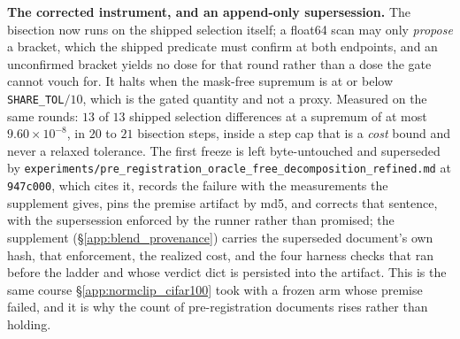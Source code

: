 \documentclass{article}
\begin{document}
\textbf{The corrected instrument, and an append-only supersession.} The bisection now runs on the shipped selection itself; a float64 scan may only \emph{propose} a bracket, which the shipped predicate must confirm at both endpoints, and an unconfirmed bracket yields no dose for that round rather than a dose the gate cannot vouch for. It halts when the mask-free supremum is at or below \texttt{SHARE\_TOL}$/10$, which is the gated quantity and not a proxy. Measured on the same rounds: $13$ of $13$ shipped selection differences at a supremum of at most $9.60{\times}10^{-8}$, in $20$ to $21$ bisection steps, inside a step cap that is a \emph{cost} bound and never a relaxed tolerance. The first freeze is left byte-untouched and superseded by \texttt{experiments/\allowbreak pre\_registration\_\allowbreak oracle\_free\_\allowbreak decomposition\_refined.md} at \texttt{947c000}, which cites it, records the failure with the measurements the supplement gives, pins the premise artifact by md5, and corrects that sentence, with the supersession enforced by the runner rather than promised; the supplement (§\ref{app:blend_provenance}) carries the superseded document's own hash, that enforcement, the realized cost, and the four harness checks that ran before the ladder and whose verdict dict is persisted into the artifact. This is the same course §\ref{app:normclip_cifar100} took with a frozen arm whose premise failed, and it is why the count of pre-registration documents rises rather than holding.
\end{document}
